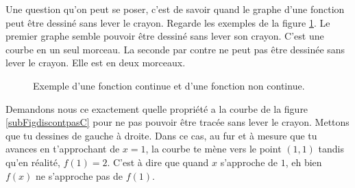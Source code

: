 \documentclass{article}
\begin{document}
Une question qu'on peut se poser, c'est de savoir quand le graphe d'une fonction peut être dessiné sans lever le crayon. Regarde les exemples de la figure \ref{FigUncontDeuxpasC}. Le premier graphe semble pouvoir être dessiné sans lever son crayon. C'est une courbe en un seul morceau. La seconde par contre ne peut pas être dessinée sans lever le crayon. Elle est en deux morceaux.
\begin{figure}[ht] 
\centering
{}
%
%
\caption{Exemple d'une fonction continue et d'une fonction non continue.}\label{FigUncontDeuxpasC}
\end{figure}

Demandons nous ce exactement quelle propriété a la courbe de la figure \ref{subFigdiscontpasC} pour ne pas pouvoir être tracée sans lever le crayon. Mettons que tu dessines de gauche à droite. Dans ce cas, au fur et à mesure que tu avances en t'approchant de $x=1$, la courbe te mène vers le point $(1,1)$ tandis qu'en réalité, $f(1)=2$. C'est à dire que quand $x$ s'approche de $1$, eh bien $f(x)$ ne s'approche pas de $f(1)$.
\end{document}
